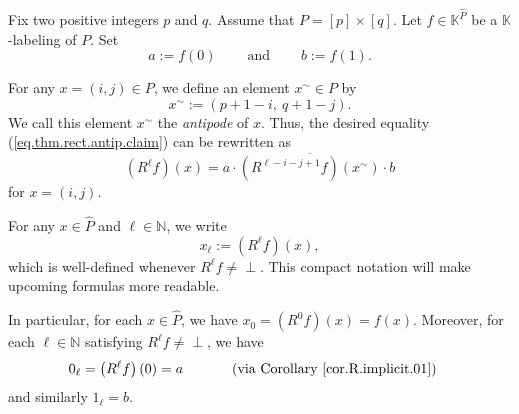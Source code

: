 \documentclass[numbers=enddot,12pt,final,onecolumn,notitlepage]{scrartcl}%
\theoremstyle{definition}
\newenvironment{vershort}{}{}
\newcommand{\undf}{\operatorname*{\bot}}
\begin{document}


Fix two positive integers $p$ and $q$. Assume that $P = \left[  p\right]
\times\left[  q\right]  $. Let $f\in\mathbb{K}^{\widehat{P}}$ be a
$\mathbb{K}$-labeling of $P$. Set%
\[
a:=f\left(  0\right)  \ \ \ \ \ \ \ \ \ \ \text{and}%
\ \ \ \ \ \ \ \ \ \ b:=f\left(  1\right)  .
\]




For any $x=\left(  i,j\right)  \in P$, we define an element $x^{\sim}\in P$
by
\[
x^{\sim} :=\left(  p+1-i,\ q+1-j\right)  .
\]
We call this element $x^{\sim}$ the \emph{antipode} of $x$. Thus, the desired
equality (\ref{eq.thm.rect.antip.claim}) can be rewritten as%
\begin{equation}
\left(  R^{\ell}f\right)  \left(  x\right)  =a\cdot\overline{\left(
R^{\ell-i-j+1}f\right)  \left(  x^{\sim}\right)  }\cdot b
\label{eq.thm.rect.antip.claim.rewr}%
\end{equation}
for $x=\left(  i,j\right)  $.

For any $x\in\widehat{P}$ and $\ell\in\mathbb{N}$, we write%
\begin{equation}
x_{\ell}:=\left(  R^{\ell}f\right)  \left(  x\right)  , \label{eq.xl=}%
\end{equation}
which is well-defined whenever $R^{\ell}f\neq\undf$. This compact notation
will make upcoming formulas more readable.

\begin{vershort}
In particular, for each $x\in\widehat{P}$, we have $x_{0}=\left(
R^{0}f\right)  \left(  x\right)  =f\left(  x\right)  $.
Moreover, for each $\ell\in\mathbb{N}$ satisfying $R^{\ell}f\neq\undf$, we
have
\begin{align}
0_{\ell}  &  =\left(  R^{\ell}f\right)  \left(  0\right)  =a
\ \ \ \ \ \ \ \ \ \ \left(  \text{via Corollary \ref{cor.R.implicit.01}%
}\right)  \label{eq.0l.a.short}%
\end{align}
and similarly $1_{\ell}=b$.
\end{vershort}
\end{document}
